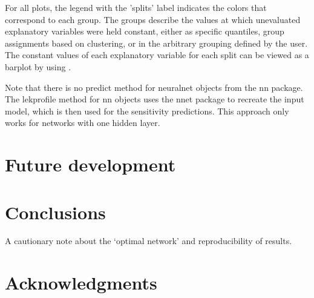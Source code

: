 \documentclass[article]{jss}\usepackage[]{graphicx}\usepackage[]{color}
\begin{document}
For all plots, the legend with the 'splits' label indicates the colors that correspond to each group. The groups describe the values at which unevaluated explanatory variables were held constant, either as specific quantiles, group assignments based on clustering, or in the arbitrary grouping defined by the user. The constant values of each explanatory variable for each split can be viewed as a barplot by using .

Note that there is no predict method for neuralnet objects from the nn package. The lekprofile method for nn objects uses the nnet package to recreate the input model, which is then used for the sensitivity predictions. This approach only works for networks with one hidden layer.

\section[Future development]{Future development}


\section[Conclusions]{Conclusions}

A cautionary note about the `optimal network' and reproducibility of results.  

\section[Acknowledgments]{Acknowledgments}



\end{document}
